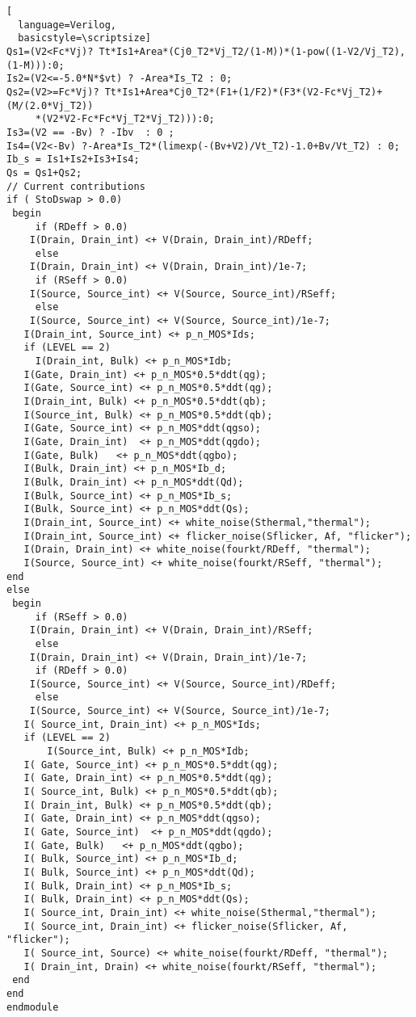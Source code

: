 \begin{lstlisting}[
  language=Verilog,
  basicstyle=\scriptsize]
Qs1=(V2<Fc*Vj)? Tt*Is1+Area*(Cj0_T2*Vj_T2/(1-M))*(1-pow((1-V2/Vj_T2),(1-M))):0;
Is2=(V2<=-5.0*N*$vt) ? -Area*Is_T2 : 0;
Qs2=(V2>=Fc*Vj)? Tt*Is1+Area*Cj0_T2*(F1+(1/F2)*(F3*(V2-Fc*Vj_T2)+(M/(2.0*Vj_T2))
     *(V2*V2-Fc*Fc*Vj_T2*Vj_T2))):0;
Is3=(V2 == -Bv) ? -Ibv  : 0 ;
Is4=(V2<-Bv) ?-Area*Is_T2*(limexp(-(Bv+V2)/Vt_T2)-1.0+Bv/Vt_T2) : 0;
Ib_s = Is1+Is2+Is3+Is4;
Qs = Qs1+Qs2;
// Current contributions
if ( StoDswap > 0.0)
 begin
     if (RDeff > 0.0)
	I(Drain, Drain_int) <+ V(Drain, Drain_int)/RDeff;
     else
	I(Drain, Drain_int) <+ V(Drain, Drain_int)/1e-7;
     if (RSeff > 0.0)
	I(Source, Source_int) <+ V(Source, Source_int)/RSeff;
     else
	I(Source, Source_int) <+ V(Source, Source_int)/1e-7;
   I(Drain_int, Source_int) <+ p_n_MOS*Ids;
   if (LEVEL == 2)
     I(Drain_int, Bulk) <+ p_n_MOS*Idb;
   I(Gate, Drain_int) <+ p_n_MOS*0.5*ddt(qg);
   I(Gate, Source_int) <+ p_n_MOS*0.5*ddt(qg);
   I(Drain_int, Bulk) <+ p_n_MOS*0.5*ddt(qb);
   I(Source_int, Bulk) <+ p_n_MOS*0.5*ddt(qb);
   I(Gate, Source_int) <+ p_n_MOS*ddt(qgso);
   I(Gate, Drain_int)  <+ p_n_MOS*ddt(qgdo);
   I(Gate, Bulk)   <+ p_n_MOS*ddt(qgbo);
   I(Bulk, Drain_int) <+ p_n_MOS*Ib_d;
   I(Bulk, Drain_int) <+ p_n_MOS*ddt(Qd);
   I(Bulk, Source_int) <+ p_n_MOS*Ib_s;
   I(Bulk, Source_int) <+ p_n_MOS*ddt(Qs);
   I(Drain_int, Source_int) <+ white_noise(Sthermal,"thermal");
   I(Drain_int, Source_int) <+ flicker_noise(Sflicker, Af, "flicker");
   I(Drain, Drain_int) <+ white_noise(fourkt/RDeff, "thermal");
   I(Source, Source_int) <+ white_noise(fourkt/RSeff, "thermal");
end
else
 begin
     if (RSeff > 0.0)
	I(Drain, Drain_int) <+ V(Drain, Drain_int)/RSeff;
     else
	I(Drain, Drain_int) <+ V(Drain, Drain_int)/1e-7;
     if (RDeff > 0.0)
	I(Source, Source_int) <+ V(Source, Source_int)/RDeff;
     else
	I(Source, Source_int) <+ V(Source, Source_int)/1e-7;
   I( Source_int, Drain_int) <+ p_n_MOS*Ids;
   if (LEVEL == 2)
       I(Source_int, Bulk) <+ p_n_MOS*Idb;
   I( Gate, Source_int) <+ p_n_MOS*0.5*ddt(qg);
   I( Gate, Drain_int) <+ p_n_MOS*0.5*ddt(qg);
   I( Source_int, Bulk) <+ p_n_MOS*0.5*ddt(qb);
   I( Drain_int, Bulk) <+ p_n_MOS*0.5*ddt(qb);
   I( Gate, Drain_int) <+ p_n_MOS*ddt(qgso);
   I( Gate, Source_int)  <+ p_n_MOS*ddt(qgdo);
   I( Gate, Bulk)   <+ p_n_MOS*ddt(qgbo);
   I( Bulk, Source_int) <+ p_n_MOS*Ib_d;
   I( Bulk, Source_int) <+ p_n_MOS*ddt(Qd);
   I( Bulk, Drain_int) <+ p_n_MOS*Ib_s;
   I( Bulk, Drain_int) <+ p_n_MOS*ddt(Qs);
   I( Source_int, Drain_int) <+ white_noise(Sthermal,"thermal");
   I( Source_int, Drain_int) <+ flicker_noise(Sflicker, Af, "flicker");
   I( Source_int, Source) <+ white_noise(fourkt/RDeff, "thermal");
   I( Drain_int, Drain) <+ white_noise(fourkt/RSeff, "thermal");
 end
end
endmodule
\end{lstlisting}

